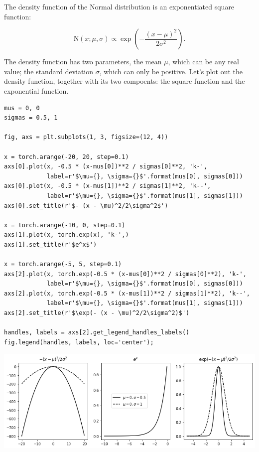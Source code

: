 \documentclass[11pt]{article}
\begin{document}
The density function of the Normal distribution is an exponentiated square function:

$$\text{N}(x; \mu, \sigma) \propto \exp(- \frac{(x - \mu)^2}{2\sigma^2}).$$

The density function has two parameters, the mean \(\mu\), which can be any real value; the standard deviation \(\sigma\), which can only be positive. Let's plot out the density function, together with its two compoents: the square function and the exponential function.

\begin{verbatim}
mus = 0, 0
sigmas = 0.5, 1

fig, axs = plt.subplots(1, 3, figsize=(12, 4))

x = torch.arange(-20, 20, step=0.1)
axs[0].plot(x, -0.5 * (x-mus[0])**2 / sigmas[0]**2, 'k-',
            label=r'$\mu={}, \sigma={}$'.format(mus[0], sigmas[0]))
axs[0].plot(x, -0.5 * (x-mus[1])**2 / sigmas[1]**2, 'k--',
            label=r'$\mu={}, \sigma={}$'.format(mus[1], sigmas[1]))
axs[0].set_title(r'$- (x - \mu)^2/2\sigma^2$')

x = torch.arange(-10, 0, step=0.1)
axs[1].plot(x, torch.exp(x), 'k-',)
axs[1].set_title(r'$e^x$')

x = torch.arange(-5, 5, step=0.1)
axs[2].plot(x, torch.exp(-0.5 * (x-mus[0])**2 / sigmas[0]**2), 'k-',
            label=r'$\mu={}, \sigma={}$'.format(mus[0], sigmas[0]))
axs[2].plot(x, torch.exp(-0.5 * (x-mus[1])**2 / sigmas[1]**2), 'k--',
            label=r'$\mu={}, \sigma={}$'.format(mus[1], sigmas[1]))
axs[2].set_title(r'$\exp(- (x - \mu)^2/2\sigma^2)$')

handles, labels = axs[2].get_legend_handles_labels()
fig.legend(handles, labels, loc='center');
\end{verbatim}

\begin{center}
\includegraphics[width=.9\linewidth]{./.ob-jupyter/e38f535fecdb4c3e4283ca3f8f37e7246bc89b2b.png}
\end{center}
\end{document}
